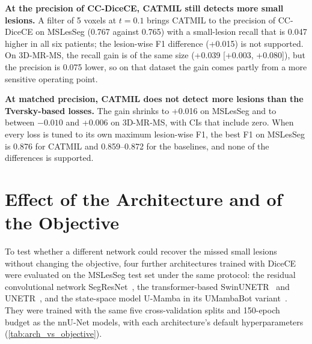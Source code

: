 \textbf{At the precision of CC-DiceCE, CATMIL still detects more small
lesions.} A filter of 5 voxels at $t = 0.1$ brings CATMIL to the precision
of CC-DiceCE on MSLesSeg (0.767 against 0.765) with a small-lesion recall
that is 0.047 higher in all six patients; the lesion-wise F1 difference
(+0.015) is not supported. On 3D-MR-MS, the recall gain is of the same size
(+0.039 [+0.003, +0.080]), but the precision is 0.075 lower, so on that
dataset the gain comes partly from a more sensitive operating point.

\textbf{At matched precision, CATMIL does not detect more lesions than the
Tversky-based losses.} The gain shrinks to +0.016 on MSLesSeg and to
between $-0.010$ and +0.006 on 3D-MR-MS, with CIs that include zero. When
every loss is tuned to its own maximum lesion-wise F1, the best F1 on
MSLesSeg is 0.876 for CATMIL and 0.859--0.872 for the baselines, and none
of the differences is supported.

\section{Effect of the Architecture and of the Objective}
\label{sec:arch_vs_objective}

To test whether a different network could recover the missed small lesions
without changing the objective, four further architectures trained with
DiceCE were evaluated on the MSLesSeg test set under the same protocol: the
residual convolutional network SegResNet~\cite{crimi_3d_2019}, the
transformer-based SwinUNETR~\cite{hatamizadeh_swin_2022} and
UNETR~\cite{hatamizadeh_unetr_2021}, and the state-space model U-Mamba in
its UMambaBot variant~\cite{ma_u-mamba_2024}. They were trained with the
same five cross-validation splits and 150-epoch budget as the nnU-Net
models, with each architecture's default hyperparameters
(\cref{tab:arch_vs_objective}).

